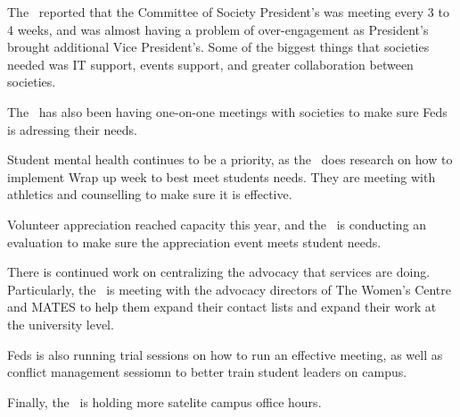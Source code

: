 \begin{information}

    The \vpi\ reported that the Committee of Society President's was meeting 
    every 3 to 4 weeks, and was almost having a problem of over-engagement as 
    President's brought additional Vice President's. Some of the biggest things
    that societies needed was IT support, events support, and greater
    collaboration between societies. 

    The \vpi\ has also been having one-on-one meetings with societies to make
    sure Feds is adressing their needs.

    Student mental health continues to be a priority, as the \vpi\ does 
    research on how to implement Wrap up week to best meet students needs. They
    are meeting with athletics and counselling to make sure it is effective.

    Volunteer appreciation reached capacity this year, and the \vpi\ is 
    conducting an evaluation to make sure the appreciation event meets student
    needs.

    There is continued work on centralizing the advocacy that services are 
    doing. Particularly, the \vpi\ is meeting with the advocacy directors of 
    The Women's Centre and MATES to help them expand their contact lists and 
    expand their work at the university level. 

    Feds is also running trial sessions on how to run an effective meeting, as
    well as conflict management sessiomn to better train student leaders on
    campus. 

    Finally, the \vpi\ is holding more satelite campus office hours.
    
\end{information}


